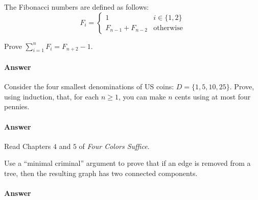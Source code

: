 \documentclass{article}
\begin{document}

\collab{\todo{}} 

The Fibonacci numbers are defined as follows:
$$
    F_i = \begin{cases}
            1 & i \in \{1,2\} \\
            F_{n-1}+F_{n-2} & \text{otherwise}
          \end{cases}
$$

Prove $\sum_{i=1}^n F_i = F_{n+2}-1$.

\paragraph{Answer}


\collab{\todo{}} 

Consider the four smallest denominations of US coins: $D=\{1,5,10,25\}$.  Prove, using
induction, that, for each $n \geq 1$, you can make $n$ cents using at most four
pennies.

\paragraph{Answer}


\collab{\todo{}} 

Read Chapters $4$ and $5$ of \emph{Four Colors Suffice}.

Use a ``minimal criminal'' argument to prove that if an edge is removed from a
tree, then the resulting graph has two connected components.

        \paragraph{Answer}

\end{document}
